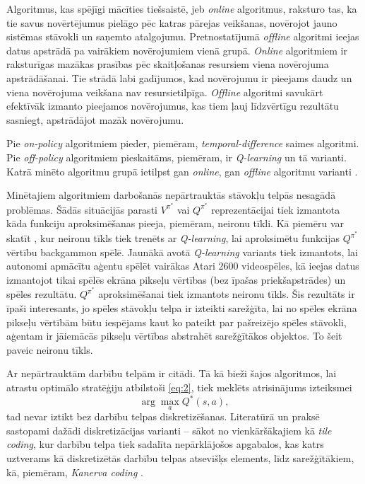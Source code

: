 \documentclass{ludis} %
\begin{document}
Algoritmus, kas spējīgi mācīties tiešsaistē, jeb \textit{online} algoritmus,
raksturo tas, ka tie savus novērtējumus pielāgo pēc katras pārejas veikšanas,
novērojot jauno sistēmas stāvokli un saņemto atalgojumu. Pretnostatījumā
\textit{offline} algoritmi ieejas datus apstrādā pa vairākiem novērojumiem vienā
grupā. \textit{Online} algoritmiem ir raksturīgas mazākas prasības pēc
skaitļošanas resursiem viena novērojuma apstrādāšanai. Tie strādā labi
gadījumos, kad novērojumu ir pieejams daudz un viena novērojuma veikšana nav
resursietilpīga. \textit{Offline} algoritmi savukārt efektīvāk izmanto pieejamos
novērojumus, kas tiem ļauj līdzvērtīgu rezultātu sasniegt, apstrādājot mazāk
novērojumu.

Pie \textit{on-policy} algoritmiem pieder, piemēram,
\textit{temporal-difference} saimes algoritmi. Pie \textit{off-policy}
algoritmiem pieskaitāms, piemēram, ir \textit{Q-learning} \autocite{Watkins1989}
\autocite{Watkins1992} un tā varianti. Katrā minēto algoritmu grupā ietilpst gan
\textit{online}, gan \textit{offline} algoritmu varianti \autocite{Barto}.

Minētajiem algoritmiem darbošanās nepārtrauktās stāvokļu telpās nesagādā
problēmas. Šādās situācijās parasti $V^{\pi^*}$ vai $Q^{\pi^*}$ reprezentācijai
tiek izmantota kāda funkciju aproksimēšanas pieeja, piemēram, neironu tīkli. Kā
piemēru var skatīt \autocite{tesauro1995temporal}, kur neironu tīkls tiek
trenēts ar \textit{Q-learning}, lai aproksimētu funkcijas $Q^{\pi^*}$ vērtību
backgammon spēlē. Jaunākā avotā \autocite{mnih2013playing} \textit{Q-learning}
variants tiek izmantots, lai autonomi apmācītu aģentu spēlēt vairākas Atari 2600
videospēles, kā ieejas datus izmantojot tikai spēlēs ekrāna pikseļu vērtības
(bez īpašas priekšapstrādes) un spēles rezultātu. $Q^{\pi^*}$ aproksimēšanai
tiek izmantots neironu tīkls. Šis rezultāts ir īpaši interesants, jo spēles
stāvokļu telpa ir izteikti sarežģīta, lai no spēles ekrāna pikseļu vērtībām būtu
iespējams kaut ko pateikt par pašreizējo spēles stāvokli, aģentam ir jāiemācās
pikseļu vērtības abstrahēt sarežģītākos objektos. To šeit paveic neironu tīkls.

Ar nepārtrauktām darbību telpām ir citādi. Tā kā bieži šajos algoritmos, lai
atrastu optimālo stratēģiju atbilstoši \eqref{eq:2}, tiek meklēts atrisinājums
izteiksmei
\[
	\arg \max_a Q^*(s, a),
\]
tad nevar iztikt bez darbību telpas diskretizēšanas. Literatūrā un praksē
sastopami dažādi diskretizācijas varianti -- sākot no vienkāršākajiem kā
\textit{tile coding}, kur darbību telpa tiek sadalīta nepārklājošos apgabalos,
kas katrs uztverams kā diskretizētās darbību telpas atsevišķs elements, līdz
sarežģītākiem, kā, piemēram, \textit{Kanerva coding} \autocite{Barto}.
\end{document}

